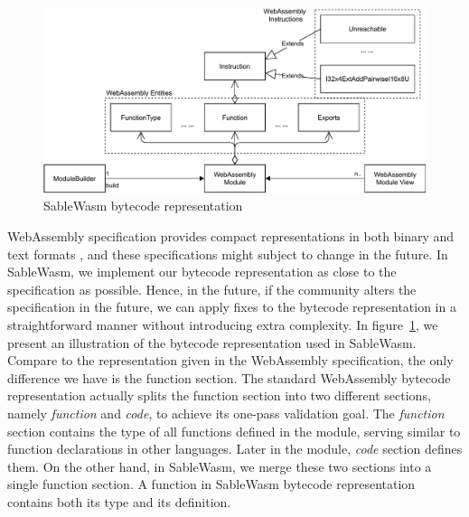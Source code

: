 \begin{figure}
  \centering
  \includegraphics[width=\textwidth]{Images/sablewasm-bytecode.pdf}
  \caption{SableWasm bytecode representation}
  \label{fig:sablewasm-bytecode}
\end{figure}

WebAssembly specification provides compact representations in both binary and text formats \cite{10.1145/3062341.3062363}, and these specifications might subject to change in the future. In SableWasm, we implement our bytecode representation as close to the specification as possible.  Hence, in the future, if the community alters the specification in the future, we can apply fixes to the bytecode representation in a straightforward manner without introducing extra complexity. In figure~\ref{fig:sablewasm-bytecode}, we present an illustration of the bytecode representation used in SableWasm. Compare to the representation given in the WebAssembly specification, the only difference we have is the function section. The standard WebAssembly bytecode representation actually splits the function section into two different sections, namely \emph{function} and \emph{code}, to achieve its one-pass validation goal. The \emph{function} section contains the type of all functions defined in the module, serving similar to function declarations in other languages. Later in the module, \emph{code} section defines them. On the other hand, in SableWasm, we merge these two sections into a single function section. A function in SableWasm bytecode representation contains both its type and its definition.

